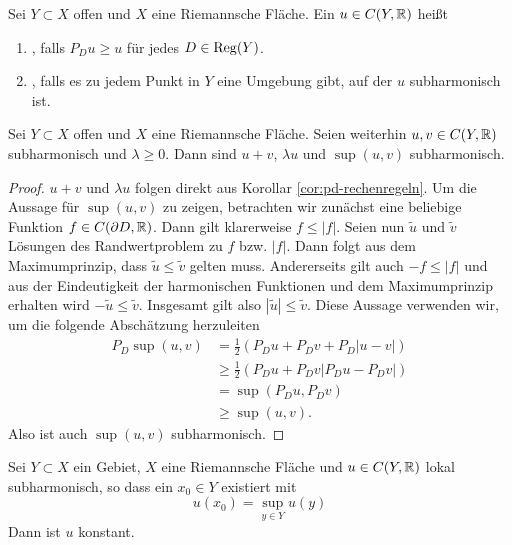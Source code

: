 \begin{defin}
  Sei $Y \subset X$ offen und $X$ eine Riemannsche Fläche.
  Ein $u \in C(Y, \mathbb{R})$ heißt
  \begin{enumerate}
  \item {}, falls $P_D u \geq u$ für jedes $D \in \operatorname{Reg}(Y)$.
  \item {}, falls es zu jedem Punkt in $Y$
    eine Umgebung gibt, auf der $u$ subharmonisch ist.
  \end{enumerate}
\end{defin}
\begin{cor}
  Sei $Y \subset X$ offen und $X$ eine Riemannsche Fläche. Seien
  weiterhin $u,v \in C(Y, \mathbb{R})$ subharmonisch und $\lambda \geq
  0$. Dann sind $u+v$, $\lambda u$ und $\sup(u,v)$ subharmonisch.
\end{cor}

\begin{proof}
  $u+v$ und $\lambda u$ folgen direkt aus Korollar
  \ref{cor:pd-rechenregeln}. Um die Aussage für $\sup(u,v)$ zu zeigen,
  betrachten wir zunächst eine beliebige Funktion $f \in C(\partial D,
  \mathbb{R})$. Dann gilt klarerweise $f \leq |f|$. Seien nun $\tilde u$ und
  $\tilde v$ Lösungen des Randwertproblem zu $f$ bzw. $|f|$. Dann
  folgt aus dem Maximumprinzip, dass $\tilde u \leq \tilde v$ gelten
  muss. Andererseits gilt auch $-f \leq |f|$ und aus der Eindeutigkeit
  der harmonischen Funktionen und dem Maximumprinzip erhalten wird $-
  \tilde u \leq \tilde v$. Insgesamt gilt also $|\tilde u| \leq \tilde
  v$. Diese Aussage verwenden wir, um die folgende Abschätzung herzuleiten
  \begin{align*}
    P_D \sup(u,v) & = \frac{1}{2} ( P_D u + P_D v + P_D|u - v|) \\
    & \geq \frac12 (P_D u + P_D v |P_D u - P_D v|) \\
    & = \sup(P_D u, P_D v) \\
    & \geq \sup(u,v).
  \end{align*}
  Also ist auch $\sup(u,v)$ subharmonisch.
\end{proof}

\begin{thm}
  Sei $Y \subset X$ ein Gebiet, $X$ eine Riemannsche Fläche und $u
  \in C(Y, \mathbb{R})$ lokal subharmonisch, so dass ein $x_0 \in Y$ existiert
  mit
  \[
  u(x_0) = \sup_{y\in Y} u(y)
  \]
  Dann ist $u$ konstant.
\end{thm}

